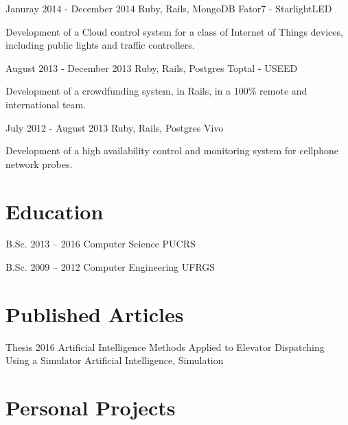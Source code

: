 \documentclass{tccv}
\begin{document}
\begin{eventlist}
    \item{Januray 2014 - December 2014}
      {Ruby, Rails, MongoDB}
      {Fator7 - StarlightLED}

      Development of a Cloud control system for a class of Internet of Things devices,
      including public lights and traffic controllers.

    \item{August 2013 - December 2013}
      {Ruby, Rails, Postgres}
      {Toptal - USEED}

      Development of a crowdfunding system, in Rails, in a 100\% remote and
      international team.

    \item{July 2012 - August 2013}
      {Ruby, Rails, Postgres}
      {Vivo}
      
      Development of a high availability control and monitoring system for cellphone
      network probes.

    \end{eventlist}

    \section{Education}

    \begin{yearlist}

    \item[B.Sc.]{2013 -- 2016}
      {Computer Science}
      {PUCRS}

    \item[B.Sc.]{2009 -- 2012}
      {Computer Engineering}
      {UFRGS}

    \end{yearlist}

    \section{Published Articles}
    \begin{yearlist}
    \item[Thesis]{2016}
      {Artificial Intelligence Methods Applied to Elevator Dispatching Using a Simulator}
      {Artificial Intelligence, Simulation}
    \end{yearlist}

    \section{Personal Projects}
\end{document}
